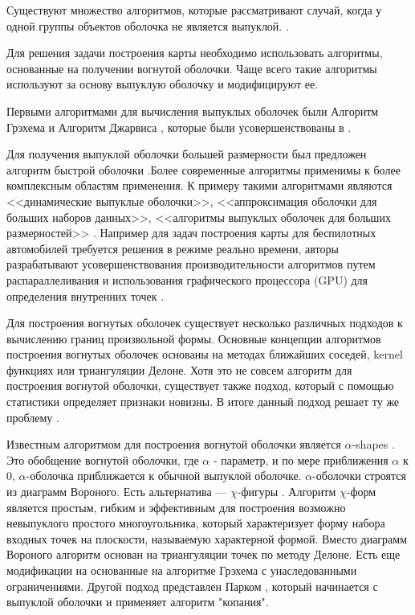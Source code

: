 Существуют множество алгоритмов, которые рассматривают случай, когда у одной группы объектов оболочка не является выпуклой. \cite{rejerHypertubePossibleInterpolation2006,j.a.leonardUsingRadialBasis1992,verleysenLearningHighdimensionalData2001}.

Для решения задачи построения карты необходимо использовать алгоритмы, основанные на получении вогнутой оболочки. Чаще всего такие алгоритмы используют за основу выпуклую оболочку и модифицируют ее.

Первыми алгоритмами для вычисления выпуклых оболочек были Алгоритм Грэхема \cite{grahamEfficientAlgorithDetermining1972} и Алгоритм Джарвиса \cite{jarvisIdentificationConvexHull1973}, которые были усовершенствованы в \cite{chanOptimalOutputsensitiveConvex1996}.

Для получения выпуклой оболочки большей размерности был предложен алгоритм быстрой оболочки \cite{clarksonApplicationsRandomSampling1988}.Более современные алгоритмы применимы к более комплексным областям применения. К примеру такими алгоритмами являются <<динамические выпуклые оболочки>>, <<аппроксимация оболочки для больших наборов данных>>, <<алгоритмы выпуклых оболочек для больших размерностей>> \cite{brodalDynamicPlanarConvex2002,khosravaniSimpleAlgorithmConvex2013,zhongFindingConvexHull2014}. Например для задач построения карты для беспилотных автомобилей требуется решения в режиме реально времени, авторы разрабатывают усовершенствования производительности алгоритмов путем распараллеливания и использования графического процессора (GPU) для определения внутренних точек \cite{zhongFindingConvexHull2014,cintraSpeculativeParallelizationRandomized2004,cintraSpeculativeParallelizationRandomized2004,tangSMI2012Full2012,tzengFindingConvexHulls2012}.

Для построения вогнутых оболочек существует несколько различных подходов к вычислению границ произвольной формы. Основные концепции алгоритмов построения вогнутых оболочек основаны на методах ближайших соседей, kernel функциях или триангуляции Делоне. Хотя это не совсем алгоритм для построения вогнутой оболочки, существует также подход, который с помощью статистики определяет признаки новизны. В итоге данный подход решает ту же проблему \cite{zhongFindingConvexHull2014}. 

Известным алгоритмом для построения вогнутой оболочки является $\alpha$-shapes \cite{edelsbrunnerShapeSetPoints1983,edelsbrunnerThreedimensionalAlphaShapes1992}. Это обобщение вогнутой оболочки, где $\alpha$ - параметр, и по мере приближения $\alpha$ к 0, $\alpha$-оболочка приближается к обычной выпуклой оболочке. $\alpha$-оболочки строятся из диаграмм Вороного. Есть альтернатива --- $\chi$-фигуры \cite{duckhamEfficientGenerationSimple2008}. Алгоритм $\chi$-форм является простым, гибким и эффективным для построения возможно невыпуклого простого многоугольника, который характеризует форму набора входных точек на плоскости, называемую характерной формой. Вместо диаграмм Вороного алгоритм основан на триангуляции точек по методу Делоне. Есть еще модификации на основанные на алгоритме Грэхема \cite{xuConcaveHullAlgorithm2010} с унаследованными ограничениями.  Другой подход представлен Парком \cite{parkNewConcaveHull2012}, который начинается с выпуклой оболочки и применяет алгоритм "копания". 

